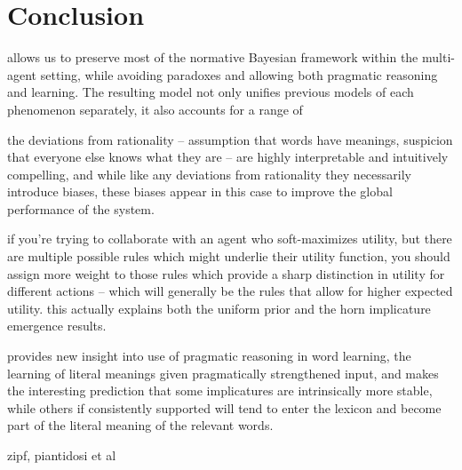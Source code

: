 \documentclass{article} %
\begin{document}
\section{Conclusion}

allows us to preserve most of the normative Bayesian framework within the multi-agent setting, while avoiding paradoxes and allowing both pragmatic reasoning and learning. The resulting model not only unifies previous models of each phenomenon separately, it also accounts for a range of 

the deviations from rationality -- assumption that words have meanings, suspicion that everyone else knows what they are -- are highly interpretable and intuitively compelling, and while like any deviations from rationality they necessarily introduce biases, these biases appear in this case to improve the global performance of the system. 

if you're trying to collaborate with an agent who soft-maximizes utility, but there are multiple possible rules which might underlie their utility function, you should assign more weight to those rules which provide a sharp distinction in utility for different actions -- which will generally be the rules that allow for higher expected utility. this actually explains both the uniform prior and the horn implicature emergence results.

provides new insight into use of pragmatic reasoning in word learning, the learning of literal meanings given pragmatically strengthened input, and makes the interesting prediction that some implicatures are intrinsically more stable, while others if consistently supported will tend to enter the lexicon and become part of the literal meaning of the relevant words.

zipf, piantidosi et al




\newpage



\end{document}
